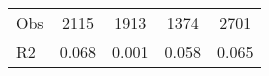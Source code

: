 \begin{tabular}{l*{4}{c}}
\hline                                                                                                                                                                                                                                            
 Obs                   &               2115               &       1913                       &       1374                &              2701                                               \\ 
 R2                    &                      0.068              &              0.001                      &              0.058               &                     0.065                                              \\ 
\hline \end{tabular}                                                                                                                                                                                                              